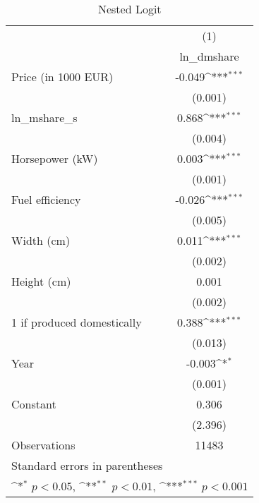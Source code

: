 \begin{table}[htbp]\centering
\def\sym#1{\ifmmode^{#1}\else\(^{#1}\)\fi}
\caption{Nested Logit \label{tab4}}
\begin{tabular}{l*{1}{c}}
\hline\hline
                    &\multicolumn{1}{c}{(1)}\\
                    &\multicolumn{1}{c}{ln\_dmshare}\\
\hline
Price (in 1000 EUR) &      -0.049\sym{***}\\
                    &     (0.001)         \\
[1em]
ln\_mshare\_s         &       0.868\sym{***}\\
                    &     (0.004)         \\
[1em]
Horsepower (kW)     &       0.003\sym{***}\\
                    &     (0.001)         \\
[1em]
Fuel efficiency     &      -0.026\sym{***}\\
                    &     (0.005)         \\
[1em]
Width (cm)          &       0.011\sym{***}\\
                    &     (0.002)         \\
[1em]
Height (cm)         &       0.001         \\
                    &     (0.002)         \\
[1em]
1 if produced domestically&       0.388\sym{***}\\
                    &     (0.013)         \\
[1em]
Year                &      -0.003\sym{*}  \\
                    &     (0.001)         \\
[1em]
Constant            &       0.306         \\
                    &     (2.396)         \\
\hline
Observations        &       11483         \\
\hline\hline
\multicolumn{2}{l}{\footnotesize Standard errors in parentheses}\\
\multicolumn{2}{l}{\footnotesize \sym{*} \(p<0.05\), \sym{**} \(p<0.01\), \sym{***} \(p<0.001\)}\\
\end{tabular}
\end{table}
